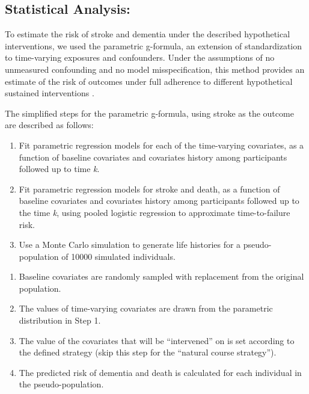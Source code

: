 \documentclass[
]{book}
\begin{document}
\hypertarget{statistical-analysis}{%
\subsection{Statistical Analysis:}\label{statistical-analysis}}

To estimate the risk of stroke and dementia under the described hypothetical interventions, we used the parametric g-formula, an extension of standardization to time-varying exposures and confounders. Under the assumptions of no unmeasured confounding and no model misspecification, this method provides an estimate of the risk of outcomes under full adherence to different hypothetical sustained interventions \autocite{taubman2009,garcia-aymerich2014,danaei_epid2013,vangenlonne2018,dickerman2019}.

The simplified steps for the parametric g-formula, using stroke as the outcome are described as follows:

\begin{enumerate}
\def\labelenumi{\arabic{enumi}.}
\item
  Fit parametric regression models for each of the time-varying covariates, as a function of baseline covariates and covariates history among participants followed up to time \emph{k}.
\item
  Fit parametric regression models for stroke and death, as a function of baseline covariates and covariates history among participants followed up to the time \emph{k}, using pooled logistic regression to approximate time-to-failure risk.
\item
  Use a Monte Carlo simulation to generate life histories for a pseudo-population of 10000 simulated individuals.
\end{enumerate}

\begin{enumerate}
\def\labelenumi{\alph{enumi}.}
\item
  Baseline covariates are randomly sampled with replacement from the original population.
\item
  The values of time-varying covariates are drawn from the parametric distribution in Step 1.
\item
  The value of the covariates that will be ``intervened'' on is set according to the defined strategy (skip this step for the ``natural course strategy'').
\item
  The predicted risk of dementia and death is calculated for each individual in the pseudo-population.
\end{enumerate}
\end{document}
